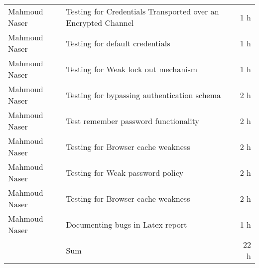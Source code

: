 \begin{table}[htpb]
\begin{tabularx}{\textwidth}{l X r}
      Mahmoud Naser & Testing for Credentials Transported over an Encrypted Channel & 1 h \\ %
      Mahmoud Naser & Testing for default credentials & 1 h \\ %
      Mahmoud Naser & Testing for Weak lock out mechanism & 1 h \\ %
      Mahmoud Naser & Testing for bypassing authentication schema & 2 h \\ %
      Mahmoud Naser & Test remember password functionality & 2 h \\ %
      Mahmoud Naser & Testing for Browser cache weakness & 2 h \\ %
      Mahmoud Naser & Testing for Weak password policy & 2 h \\ %
      Mahmoud Naser & Testing for Browser cache weakness & 2 h \\ %
      
      Mahmoud Naser & Documenting bugs in Latex report & 1 h \\ %
      
      & Sum & 22 h \\
    \bottomrule
  \end{tabularx}
\end{table}
